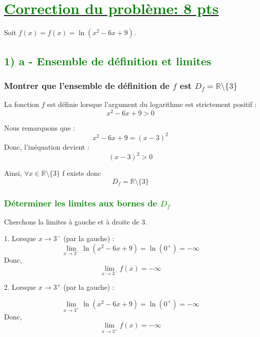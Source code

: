 \documentclass[12pt]{article}
\begin{document}
\section*{\underline{\textcolor{green}{Correction du problème: \textbf{8 pts}}}}
Soit \( f(x) = f(x)=\ln(x^{2}-6x+9) \).

\subsection*{\textcolor{green}{1) a - Ensemble de définition et limites}}
\subsubsection*{Montrer que l'ensemble de définition de \( f \) est \( D_f = \mathbb{R} \setminus \{3\} \)}
La fonction \( f \) est définie lorsque l'argument du logarithme est strictement positif :
\[
x^{2}-6x+9 > 0
\]

Nous remarquons que :
\[
x^{2}-6x+9 = (x - 3)^2
\]
Donc, l'inéquation devient :
\[
(x - 3)^2 > 0
\]

Ainsi, $\forall x\in \mathbb{R}\setminus \{3\}$ f existe donc
\[
D_f = \mathbb{R} \setminus \{3\}
\]

\subsubsection*{\textcolor{green}{Déterminer les limites aux bornes de \( D_f \)}}
Cherchons la limites à gauche et à droite de 3.

1. Lorsque \( x \to 3^{-} \) (par la gauche) :
\[
\lim_{x \to 3^{-}}\ln (x^{2}-6x+9)=\ln(0^{+})=-\infty
\]
Donc,
\[
\lim_{x \to 3^-} f(x) = -\infty
\]

2. Lorsque \( x \to 3^+ \) (par la gauche) :

\[
\lim_{x \to 3^{+}}\ln (x^{2}-6x+9)=\ln(0^{+})=-\infty
\]
Donc,
\[
\lim_{x \to 3^+} f(x) = -\infty
\]
\end{document}
